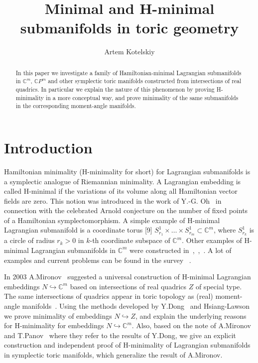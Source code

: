 \documentclass[jsg]{IP_v1_forauthors}
\theoremstyle{definition}
\numberwithin{equation}{section}
\begin{document}
\title[Minimal and H-minimal submanifolds in toric geometry]{Minimal and H-minimal submanifolds in toric geometry}

\author{Artem Kotelskiy}


\begin{abstract}
In this paper we investigate a family of Hamiltonian-minimal Lagrangian submanifolds in ${\mathbb C}^m$, ${\mathbb C}P^m$ and other symplectic toric manifolds constructed from intersections of real quadrics. In particular we explain the nature of this phenomenon by proving H-minimality in a more conceptual way, and prove minimality of the same submanifolds in the corresponding moment-angle manifolds.
\end{abstract}


\maketitle

\tableofcontents

\section{Introduction}
Hamiltonian minimality (H-minimality for short) for Lagrangian submanifolds is a symplectic analogue
of Riemannian minimality. A Lagrangian embedding is called H-minimal if the variations of its volume
along all Hamiltonian vector fields are zero. This notion was introduced in the work of Y.-G. Oh~\cite{O}
in connection with the celebrated Arnold conjecture on the number of fixed points of a Hamiltonian
symplectomorphism. A simple example of H-minimal Lagrangian submanifold is a coordinate torus
[9] $S^1_{r_1}\times  \dots \times S^1_{r_m} \subset {\mathbb C}^m$, where $S^1_{r_k}$ is a circle of radius
$r_k > 0$ in $k$-th coordinate subspace of ${\mathbb C}^m$. Other examples of H-minimal Lagrangian submanifolds in
${\mathbb C}^m$ were constructed in~\cite{AC},~\cite{CU},~\cite{HR}. A lot of examples and
current problems can be found in the survey ~\cite{MO}.

In 2003 A.Mironov~\cite{M} suggested a universal construction of H-minimal Lagrangian embeddings $N \hookrightarrow {\mathbb C}^m$ based on
intersections of real quadrics $Z$ of special type. The same intersections of quadrics appear in toric topology as (real) moment-angle manifolds~\cite[Section 6.1]{BP}. Using the methods developed by Y.Dong~\cite{D} and Hsiang-Lawson~\cite{HL} we prove minimality of embeddings $N \hookrightarrow Z$, and explain the underlying reasons for H-minimality for embeddings $N \hookrightarrow {\mathbb C}^m$. Also, based on the note of A.Mironov and T.Panov~\cite{MP2} where they refer to the results of Y.Dong, we give an explicit construction and independent proof of H-minimality of Lagrangian submanifolds in symplectic toric manifolds, which generalize the result of A.Mironov.
\end{document}

